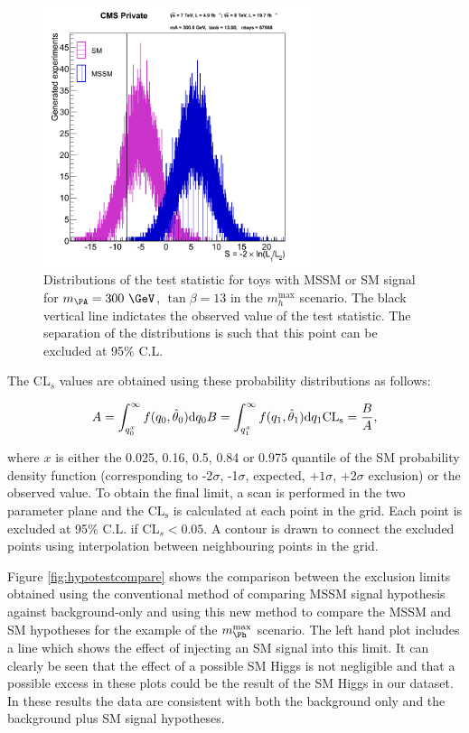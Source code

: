 \begin{figure}[tbh]
\includegraphics[width=0.7\textwidth]{plots/htt-mssm/sigsep_13.png}
\caption{Distributions of the test statistic for toys with \ac{MSSM} or \ac{SM}
signal for $m_{\PA} = 300~\GeV$, $\tan\beta = 13$ in the $m_{h}^{\text{max}}$
scenario. The black vertical line indictates the observed value of the test
statistic. The separation of the distributions is such that this point can be
excluded at 95$\%$ C.L.}
\label{fig:toydistribution}
\end{figure}

The CL$_{s}$ values are obtained using these probability distributions as
follows:

\begin{equation}
A = \int_{q_{0}^{x}}^{\infty}f(q_{0},\hat{\theta}_{0})\mathrm{d}q_{0}\, \\
B = \int_{q_{1}^{x}}^{\infty}f(q_{1},\hat{\theta}_{1})\mathrm{d}q_{1}\, \\
\mathrm{CL_{s}} = \frac{B}{A},
\end{equation}

where $x$ is either the 0.025, 0.16, 0.5, 0.84 or 0.975 quantile of the SM
probability density function (corresponding to -2$\sigma$, -1$\sigma$, expected,
$+1\sigma$, $+2\sigma$ exclusion) or the observed value. To obtain the final limit, 
a scan is performed in the two parameter plane and
the $\mathrm{CL_{s}}$ is calculated at each point in the grid. Each point is excluded at
95$\%$ C.L. if CL$_{s}<0.05$. A contour is drawn to connect the excluded points
using interpolation between neighbouring points in the grid.

Figure \ref{fig:hypotestcompare} shows the comparison between the exclusion
limits obtained using the conventional method of comparing \ac{MSSM} signal
hypothesis against background-only and using this new method to compare the
\ac{MSSM} and \ac{SM} hypotheses for the example of the $m_{\Ph}^\text{max}$
scenario. The left hand plot includes a line which shows
the effect of injecting an \ac{SM} signal into this limit. It can clearly be
seen that the effect of a possible \ac{SM} Higgs is not negligible and that a
possible excess in these plots could be the result of the \ac{SM} Higgs in our
dataset. In these results the data are consistent with both the background only
and the background plus \ac{SM} signal hypotheses.

